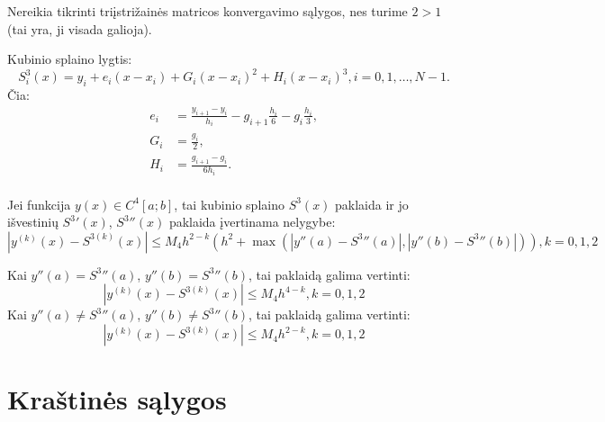 
Nereikia tikrinti triįstrižainės matricos konvergavimo sąlygos, nes
turime $2 > 1$ (tai yra, ji visada galioja).


Kubinio splaino lygtis:
\begin{equation*}
  S^{3}_{i}(x)
    = y_{i}
    + e_{i}(x-x_{i})
    + G_{i}(x-x_{i})^{2}
    + H_{i}(x-x_{i})^{3},
    i = 0,1,\ldots,N-1.
\end{equation*}
Čia:
\begin{align*}
  e_{i}
    &= \frac{y_{i+1}-y_{i}}{h_{i}}
    - g_{i+1}\frac{h_{i}}{6}
    - g_{i}\frac{h_{i}}{3}, \\
  G_{i} &= \frac{g_{i}}{2}, \\
  H_{i} &= \frac{g_{i+1} - g_{i}}{6h_{i}}. \\
\end{align*}


\begin{prop}
  Jei funkcija $y(x) \in C^{4}\left[ a; b \right]$, tai kubinio splaino
  $S^{3}(x)$ paklaida ir jo išvestinių ${S^{3}}'(x)$, ${S^{3}}''(x)$ paklaida
  įvertinama nelygybe:
  \begin{equation*}
    |y^{(k)}(x) - S^{3(k)}(x)|
      \leq M_{4}h^{2-k}(h^{2}
      + \max(|y''(a) - {S^{3}}''(a)|, |y''(b)-{S^{3}}''(b)|)),
    k = 0,1,2
  \end{equation*}
\end{prop}
Kai $y''(a)={S^{3}}''(a)$, $y''(b)={S^{3}}''(b)$, tai paklaidą galima vertinti:
\begin{equation*}
  |y^{(k)}(x) - S^{3(k)}(x)| \leq M_{4}h^{4-k}, k = 0, 1, 2
\end{equation*}
Kai $y''(a) \neq {S^{3}}''(a)$, $y''(b) \neq {S^{3}}''(b)$, tai paklaidą
galima vertinti:
\begin{equation*}
  |y^{(k)}(x) - S^{3(k)}(x)| \leq M_{4}h^{2-k}, k = 0, 1, 2
\end{equation*}



\section{Kraštinės sąlygos}

